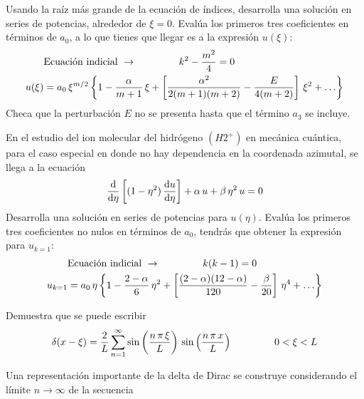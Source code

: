 \begin{milista}
Usando la raíz más grande de la ecuación de índices, desarrolla una solución en series de potencias, alrededor de $\xi=0$. Evalúa los primeros tres coeficientes en términos de $a_{0}$, a lo que tienes que llegar es a la expresión $u (\xi)$:
\begin{align*}
& \text{Ecuación indicial } \to \hspace{1.5cm} k^{2} - \dfrac{m^{2}}{4} = 0 \\
u(\xi) &=  a_{0} \, \xi^{m/2} \left\lbrace 1 - \dfrac{\alpha}{m+1} \, \xi + \left[ \dfrac{\alpha^{2}}{2(m+1)(m+2)} - \dfrac{E}{4(m+2)} \right] \, \xi^{2} + \ldots \right\rbrace
\end{align*}
Checa que la perturbación $E$ no se presenta hasta que el término $a_{3}$ se incluye.
\item En el estudio del ion molecular del hidrógeno $(H2^{+})$ en mecánica cuántica, para el caso especial en donde no hay dependencia en la coordenada azimutal, se llega a la ecuación
\begin{align*}
\dv{\eta} \left[ (1 - \eta^{2} ) \, \dv{u}{\eta} \right] + \alpha \, u + \beta \, \eta^{2} \, u = 0
\end{align*}
Desarrolla una solución en series de potencias para $u(\eta)$. Evalúa los primeros tres coeficientes no nulos en términos de $a_{0}$, tendrás que obtener la expresión para $u_{k=1}$:
\begin{align*}
& \text{Ecuación indicial } \to \hspace{1.5cm} k(k-1) = 0 \\
u_{k=1} &=  a_{0} \, \eta \left\lbrace 1 - \dfrac{2- \alpha}{6} \, \eta^{2} + \left[ \dfrac{(2-\alpha)(12-\alpha)}{120} - \dfrac{\beta}{20} \right] \, \eta^{4} + \ldots \right\rbrace
\end{align*}
\item Demuestra que se puede escribir
\begin{align*}
\delta (x - \xi) = \dfrac{2}{L} \sum_{n=1}^{\infty} \sin \left( \dfrac{n \, \pi \, \xi}{L} \right) \, \sin \left( \dfrac{n \, \pi \, x}{L} \right) \hspace{1.5cm} 0 < \xi < L
\end{align*}
\item Una representación importante de la delta de Dirac se construye considerando el límite $n \to \infty$ de la secuencia

\end{milista}
